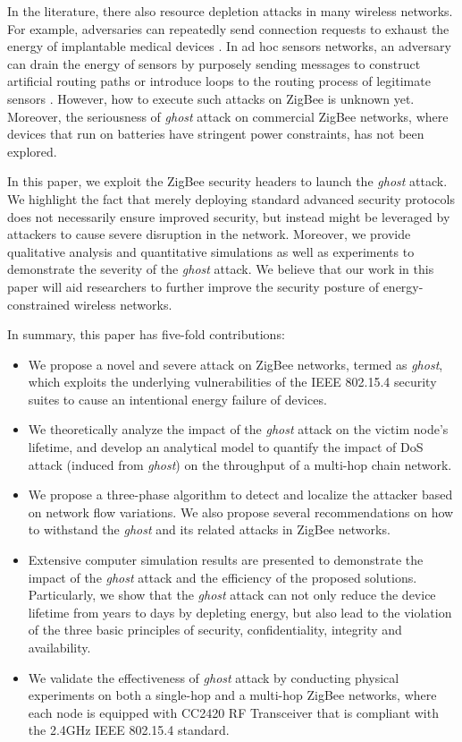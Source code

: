 \documentclass[10pt,journal,cspaper,compsoc]{IEEEtran}
\begin{document}
In the literature, there also resource depletion attacks in many wireless networks. For example, adversaries can repeatedly send connection requests to exhaust the energy of implantable medical devices \cite{hei2010defending}. In ad hoc sensors networks, an adversary can drain the energy of sensors by purposely sending messages to construct artificial routing paths or introduce loops to the routing process of legitimate sensors \cite{vasserman2013vampire}. However, how to execute such attacks on ZigBee is unknown yet. Moreover, the seriousness of {\em ghost} attack on commercial ZigBee networks, where devices that run on batteries have stringent power constraints, has not been explored.

In this paper, we exploit the ZigBee security headers to launch the {\em ghost} attack. We highlight the fact that merely deploying standard advanced security protocols does not necessarily ensure improved security, but instead might be leveraged by attackers to cause severe disruption in the network. Moreover, we provide qualitative analysis and quantitative simulations as well as experiments to demonstrate the severity of the {\em ghost} attack. We believe that our work in this paper will aid researchers to further improve the security posture of energy-constrained wireless networks.

In summary, this paper has five-fold contributions:
\begin{itemize}
\item We propose a novel and severe attack on ZigBee networks, termed as {\em ghost}, which exploits the underlying vulnerabilities of the IEEE 802.15.4 security suites to cause an intentional energy failure of devices.

\item We theoretically analyze the impact of the {\em ghost} attack on the victim node's lifetime, and develop an analytical model to quantify the impact of DoS attack (induced from {\em ghost}) on the throughput of a multi-hop chain network.

\item We propose a three-phase algorithm to detect and localize the attacker based on network flow variations. We also propose several recommendations on how to withstand the {\em ghost} and its related attacks in ZigBee networks.

\item Extensive computer simulation results are presented to demonstrate the impact of the {\em ghost} attack and the efficiency of the proposed solutions. Particularly, we show that the {\em ghost} attack can not only reduce the device lifetime from years to days by depleting energy, but also lead to the violation of the three basic principles of security, confidentiality, integrity and availability.

\item We validate the effectiveness of {\em ghost} attack by conducting physical experiments on both a single-hop and a multi-hop ZigBee networks, where each node is equipped with CC2420 RF Transceiver that is compliant with the 2.4GHz IEEE 802.15.4 standard.
\end{itemize}
\end{document}
